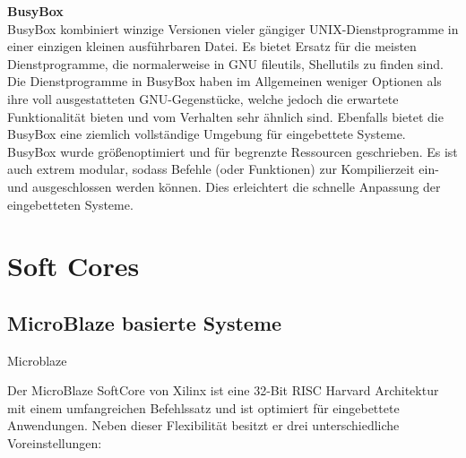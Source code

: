 \textbf{BusyBox}\\

BusyBox kombiniert winzige Versionen vieler gängiger UNIX-Dienstprogramme in einer einzigen kleinen ausführbaren Datei.
Es bietet Ersatz für die meisten Dienstprogramme, die normalerweise in GNU fileutils, Shellutils zu finden sind.
Die Dienstprogramme in BusyBox haben im Allgemeinen weniger Optionen als ihre voll ausgestatteten GNU-Gegenstücke, welche jedoch die erwartete Funktionalität bieten und vom Verhalten sehr ähnlich sind.
Ebenfalls bietet die BusyBox eine ziemlich vollständige Umgebung für eingebettete Systeme.\\
BusyBox wurde größenoptimiert und für begrenzte Ressourcen geschrieben.
Es ist auch extrem modular, sodass Befehle (oder Funktionen) zur Kompilierzeit ein- und ausgeschlossen werden können.
Dies erleichtert die schnelle Anpassung der eingebetteten Systeme.\cite{busybox}\\


\chapter{Soft Cores}\label{kap:softcores}
\section{MicroBlaze basierte Systeme}\label{kap:microblaze}
Microblaze

Der MicroBlaze SoftCore von Xilinx ist eine 32-Bit RISC Harvard Architektur mit einem umfangreichen Befehlssatz und ist optimiert für eingebettete Anwendungen.
Neben dieser Flexibilität besitzt er drei unterschiedliche Voreinstellungen:

